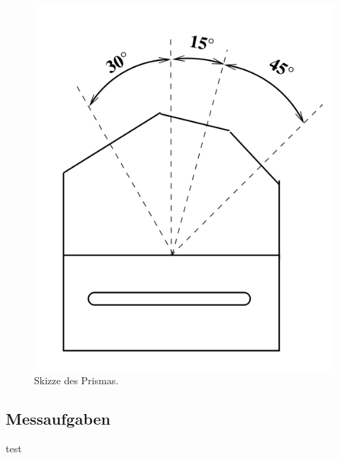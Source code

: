 \begin{figure}
    \centering
    \includegraphics[width=.2\textwidth]{content/Prisma.png}
    \caption{Skizze des Prismas.}
    \label{fig:Prisma}
\end{figure}  

\subsection{Messaufgaben}
\label{subsec:Messaufgaben}
test
